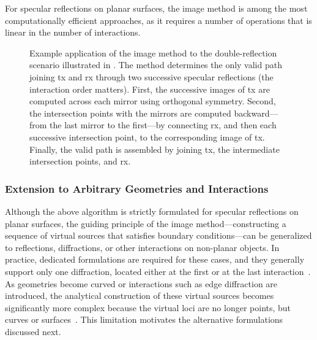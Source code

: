 For specular reflections on planar surfaces, the image method is among the most computationally efficient approaches, as it requires a number of operations that is linear in the number of interactions.

\begin{figure}
  \caption{Example application of the image method to the double-reflection scenario illustrated in . The method determines the only valid path joining \gls{tx} and \gls{rx} through two successive specular reflections (the interaction order matters). First, the successive images of \gls{tx} are computed across each mirror using orthogonal symmetry. Second, the intersection points with the mirrors are computed backward---from the last mirror to the first---by connecting \gls{rx}, and then each successive intersection point, to the corresponding image of \gls{tx}. Finally, the valid path is assembled by joining \gls{tx}, the intermediate intersection points, and \gls{rx}.}
\end{figure}

\subsubsection{Extension to Arbitrary Geometries and Interactions}

Although the above algorithm is strictly formulated for specular reflections on planar surfaces, the guiding principle of the image method---constructing a sequence of virtual sources that satisfies boundary conditions---can be generalized to reflections, diffractions, or other interactions on non-planar objects. In practice, dedicated formulations are required for these cases, and they generally support only one diffraction, located either at the first or at the last interaction~. As geometries become curved or interactions such as edge diffraction are introduced, the analytical construction of these virtual sources becomes significantly more complex because the virtual loci are no longer points, but curves or surfaces~. This limitation motivates the alternative formulations discussed next.

\subsection{\texorpdfstring{}{Min-Path-Tracing}}

